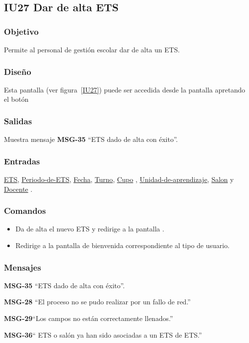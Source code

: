 
\subsection{IU27 Dar de alta ETS}
\subsubsection{Objetivo}
    Permite al personal de gestión escolar dar de alta un ETS.
\subsubsection{Diseño}
    Esta pantalla  (ver figura~\ref{IU27}) puede ser accedida desde la pantalla  apretando el botón 

\subsubsection{Salidas}
Muestra mensaje {\bf MSG-35} ``ETS  dado de alta con éxito''.
\subsubsection{Entradas}
\hyperlink{ETS.ETS }{ETS},  \hyperlink{ETS.Periodo-de-ETS }{ Periodo-de-ETS},  \hyperlink{ETS.Fecha}{Fecha},  \hyperlink{ETS.Turno}{Turno},  \hyperlink{ETS.Cupo} {Cupo} ,  \hyperlink{ETS.Unidad-de-aprendizaje }{Unidad-de-aprendizaje},  \hyperlink{ETS.Salon}{Salon} y \hyperlink{ETS.Docente}{Docente} .
\subsubsection{Comandos}
\begin{itemize}
    \item {} Da de alta el nuevo ETS y redirige a la pantalla .
    \item {} Redirige a la pantalla de bienvenida correspondiente al tipo de usuario.
    
\end{itemize}

\subsubsection{Mensajes}

\begin{Citemize}
    \item {\bf MSG-35} ``ETS  dado de alta con éxito''.
    \item {\bf MSG-28}  ``El proceso no se pudo realizar por un fallo de red.''
    \item {\bf MSG-29}{``Los campos no están correctamente llenados.''}
    \item {\bf MSG-36}{`` ETS o salón  ya han sido asociadas a un ETS de ETS.''}
    
\end{Citemize}

